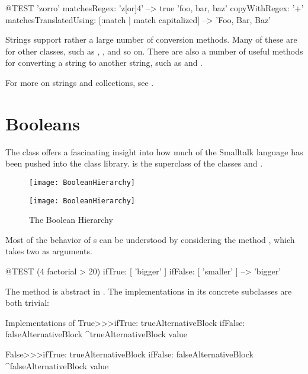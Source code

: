 \documentclass[a4paper,10pt,twoside]{book}
\begin{document}
\begin{code}{@TEST}
'zorro' matchesRegex: 'z[or]{4}' --> true
'foo, bar, baz' copyWithRegex: '\w+' matchesTranslatedUsing: [:match | match capitalized] --> 'Foo, Bar, Baz'
\end{code}

Strings support rather a large number of conversion methods.
Many of these are  for other classes, such as , , and so on.
There are also a number of useful methods for converting a string to another string, such as  and .

For more on strings and collections, see .


\section{Booleans}

The class  offers a fascinating insight into how much of the Smalltalk language has been pushed into the class library.
 is the  superclass of the  classes  and .

\begin{figure}[ht]
\ifluluelse
	{\centerline {\texttt{[image: BooleanHierarchy]}}}
	{\centerline {\texttt{[image: BooleanHierarchy]}}}
\caption{The Boolean Hierarchy \label{fig:booleans}}
\end{figure}

Most of the behavior of s can be understood by considering the method , which takes two  as arguments.

\begin{code}{@TEST}
(4 factorial > 20) ifTrue: [ 'bigger' ] ifFalse: [ 'smaller' ] --> 'bigger'
\end{code}

The method is abstract in .
The implementations in its concrete subclasses are both trivial:

\begin{method}{Implementations of }
True>>>ifTrue: trueAlternativeBlock ifFalse: falseAlternativeBlock 
    ^trueAlternativeBlock value

False>>>ifTrue: trueAlternativeBlock ifFalse: falseAlternativeBlock 
    ^falseAlternativeBlock value
\end{method}
\end{document}
